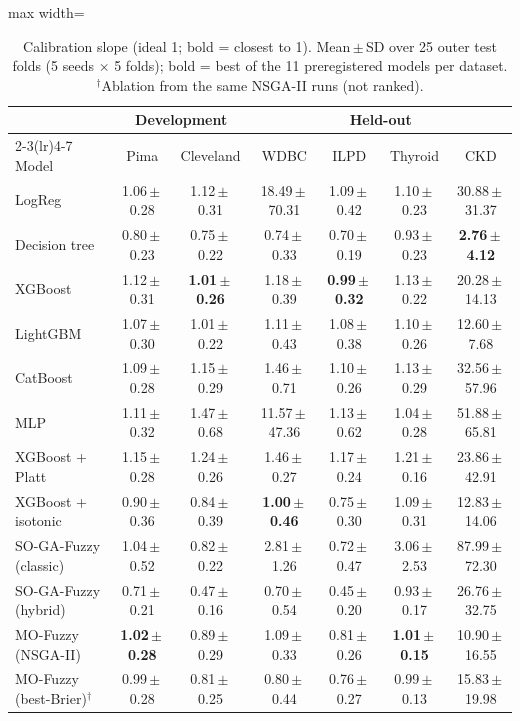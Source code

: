 \begin{table}[t]
\centering
\scriptsize
\setlength{\tabcolsep}{3pt}
\caption{Calibration slope (ideal 1; bold = closest to 1). Mean\,$\pm$\,SD over 25 outer test folds (5 seeds $\times$ 5 folds); bold = best of the 11 preregistered models per dataset. $^\dagger$Ablation from the same NSGA-II runs (not ranked).}
\label{tab:slope}
\begin{adjustbox}{max width=\linewidth}
\begin{tabular}{lcccccc}
\toprule
 & \multicolumn{2}{c}{Development} & \multicolumn{4}{c}{Held-out} \\
\cmidrule(lr){2-3}\cmidrule(lr){4-7}
Model & Pima & Cleveland & WDBC & ILPD & Thyroid & CKD \\
\midrule
LogReg & 1.06\,$\pm$\,0.28 & 1.12\,$\pm$\,0.31 & 18.49\,$\pm$\,70.31 & 1.09\,$\pm$\,0.42 & 1.10\,$\pm$\,0.23 & 30.88\,$\pm$\,31.37 \\
Decision tree & 0.80\,$\pm$\,0.23 & 0.75\,$\pm$\,0.22 & 0.74\,$\pm$\,0.33 & 0.70\,$\pm$\,0.19 & 0.93\,$\pm$\,0.23 & \textbf{2.76\,$\pm$\,4.12} \\
XGBoost & 1.12\,$\pm$\,0.31 & \textbf{1.01\,$\pm$\,0.26} & 1.18\,$\pm$\,0.39 & \textbf{0.99\,$\pm$\,0.32} & 1.13\,$\pm$\,0.22 & 20.28\,$\pm$\,14.13 \\
LightGBM & 1.07\,$\pm$\,0.30 & 1.01\,$\pm$\,0.22 & 1.11\,$\pm$\,0.43 & 1.08\,$\pm$\,0.38 & 1.10\,$\pm$\,0.26 & 12.60\,$\pm$\,7.68 \\
CatBoost & 1.09\,$\pm$\,0.28 & 1.15\,$\pm$\,0.29 & 1.46\,$\pm$\,0.71 & 1.10\,$\pm$\,0.26 & 1.13\,$\pm$\,0.29 & 32.56\,$\pm$\,57.96 \\
MLP & 1.11\,$\pm$\,0.32 & 1.47\,$\pm$\,0.68 & 11.57\,$\pm$\,47.36 & 1.13\,$\pm$\,0.62 & 1.04\,$\pm$\,0.28 & 51.88\,$\pm$\,65.81 \\
XGBoost + Platt & 1.15\,$\pm$\,0.28 & 1.24\,$\pm$\,0.26 & 1.46\,$\pm$\,0.27 & 1.17\,$\pm$\,0.24 & 1.21\,$\pm$\,0.16 & 23.86\,$\pm$\,42.91 \\
XGBoost + isotonic & 0.90\,$\pm$\,0.36 & 0.84\,$\pm$\,0.39 & \textbf{1.00\,$\pm$\,0.46} & 0.75\,$\pm$\,0.30 & 1.09\,$\pm$\,0.31 & 12.83\,$\pm$\,14.06 \\
SO-GA-Fuzzy (classic) & 1.04\,$\pm$\,0.52 & 0.82\,$\pm$\,0.22 & 2.81\,$\pm$\,1.26 & 0.72\,$\pm$\,0.47 & 3.06\,$\pm$\,2.53 & 87.99\,$\pm$\,72.30 \\
SO-GA-Fuzzy (hybrid) & 0.71\,$\pm$\,0.21 & 0.47\,$\pm$\,0.16 & 0.70\,$\pm$\,0.54 & 0.45\,$\pm$\,0.20 & 0.93\,$\pm$\,0.17 & 26.76\,$\pm$\,32.75 \\
MO-Fuzzy (NSGA-II) & \textbf{1.02\,$\pm$\,0.28} & 0.89\,$\pm$\,0.29 & 1.09\,$\pm$\,0.33 & 0.81\,$\pm$\,0.26 & \textbf{1.01\,$\pm$\,0.15} & 10.90\,$\pm$\,16.55 \\
\midrule
MO-Fuzzy (best-Brier)$^\dagger$ & 0.99\,$\pm$\,0.28 & 0.81\,$\pm$\,0.25 & 0.80\,$\pm$\,0.44 & 0.76\,$\pm$\,0.27 & 0.99\,$\pm$\,0.13 & 15.83\,$\pm$\,19.98 \\
\bottomrule
\end{tabular}
\end{adjustbox}
\end{table}
